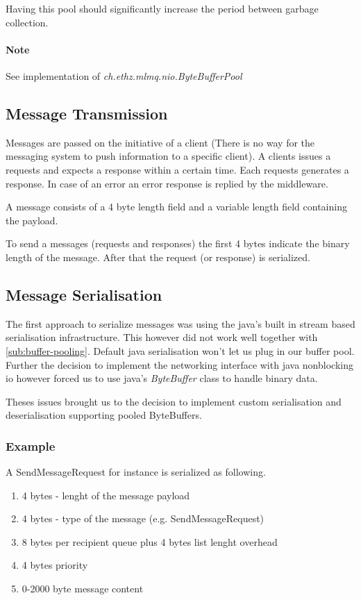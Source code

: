 \documentclass[milestone1.tex]{subfiles}
\begin{document}
Having this pool should significantly increase the period between garbage collection.

\paragraph{Note}
See implementation of \textit{ch.ethz.mlmq.nio.ByteBufferPool}

\subsection{Message Transmission}
Messages are passed on the initiative of a client (There is no way for the messaging system to push information to a specific client). A clients issues a requests and expects a response within a certain time. Each requests generates a response. In case of an error an error response is replied by the middleware.

A message consists of a 4 byte length field and a variable length field containing the payload.

To send a messages (requests and responses) the first 4 bytes indicate the binary length of the message. After that the request (or response) is serialized.

\subsection{Message Serialisation}
\label{sub:des-msg-ser}
The first approach to serialize messages was using the java's built in stream based serialisation infrastructure. This however did not work well together with \ref{sub:buffer-pooling}. Default java serialisation won't let us plug in our buffer pool. Further the decision to implement the networking interface with java nonblocking io however forced us to use java's \textit{ByteBuffer} class to handle binary data.

Theses issues brought us to the decision to implement custom serialisation and deserialisation supporting pooled ByteBuffers.

\subsubsection{Example}
A SendMessageRequest for instance is serialized as following.

\begin{enumerate}
\item 4 bytes - lenght of the message payload
\item 4 bytes - type of the message (e.g. SendMessageRequest)
\item 8 bytes per recipient queue plus 4 bytes list lenght overhead
\item 4 bytes priority
\item 0-2000 byte message content
\end{enumerate}
\end{document}
